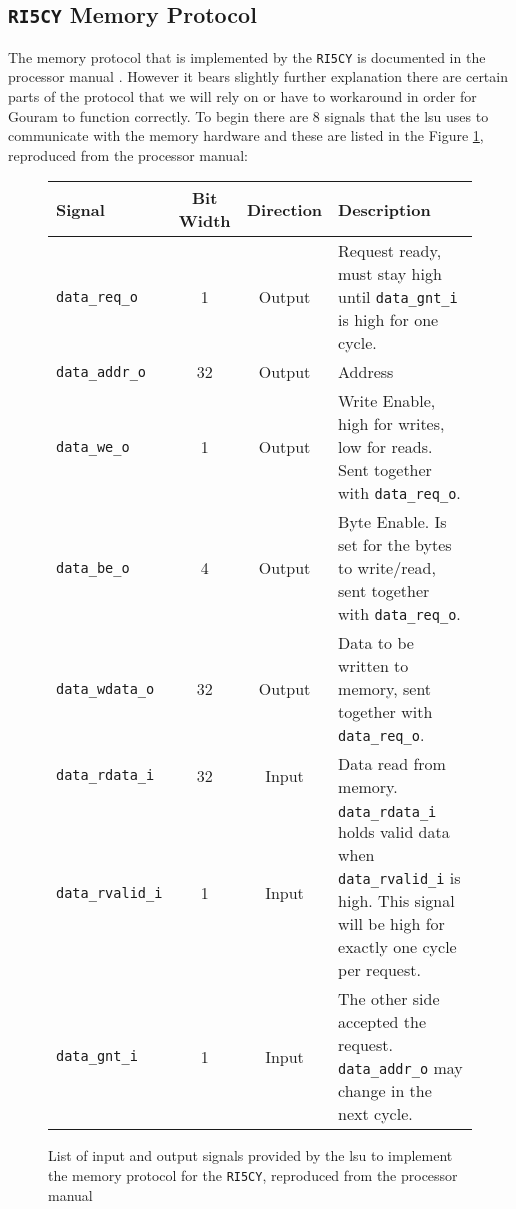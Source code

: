 \subsection{\texttt{RI5CY} Memory Protocol}

The memory protocol that is implemented by the \texttt{RI5CY} is documented in the processor manual \cite{andreastraberRI5CYUserManual2017}. However it bears slightly further explanation there are certain parts of the protocol that we will rely on or have to workaround in order for Gouram to function correctly. To begin there are 8 signals that the \gls{lsu} uses to communicate with the memory hardware and these are listed in the Figure \ref{fig:signal-table}, reproduced from the processor manual:

\begin{figure}[htbp]
	\renewcommand{\arraystretch}{1.4}
	\begin{tabular}{lccp{7cm}}
		\hline
		\textbf{Signal} & \textbf{Bit Width} &\textbf{Direction} & \textbf{Description} \\
		\hline
		\texttt{data\_req\_o}
& 1 & Output & Request ready, must stay high until \texttt{data\_gnt\_i} is high for one cycle. \\
		\texttt{data\_addr\_o} & 32 & Output & Address \\
	  	\texttt{data\_we\_o}
& 1 & Output & Write Enable, high for writes, low for reads. Sent together with \texttt{data\_req\_o}. \\
	  	\texttt{data\_be\_o} & 4 & Output & Byte Enable. Is set for the bytes to write/read, sent together with \texttt{data\_req\_o}. \\
	  	\texttt{data\_wdata\_o} & 32
& Output & Data to be written to memory, sent together with \texttt{data\_req\_o}. \\
	  	\texttt{data\_rdata\_i} & 32 & Input & Data read from memory. \\
		\texttt{data\_rvalid\_i} & 1 & Input & \texttt{data\_rdata\_i} holds valid data when \texttt{data\_rvalid\_i} is high. This signal will be high for exactly one cycle per request. \\
		\texttt{data\_gnt\_i} & 1 & Input & The other side accepted the request. \texttt{data\_addr\_o} may change in the next cycle. \\
		\hline
	\end{tabular}
\caption{List of input and output signals provided by the \gls{lsu} to implement the memory protocol for the \texttt{RI5CY}, reproduced from the processor manual \cite{andreastraberRI5CYUserManual2017}}
\label{fig:signal-table}
\end{figure}

